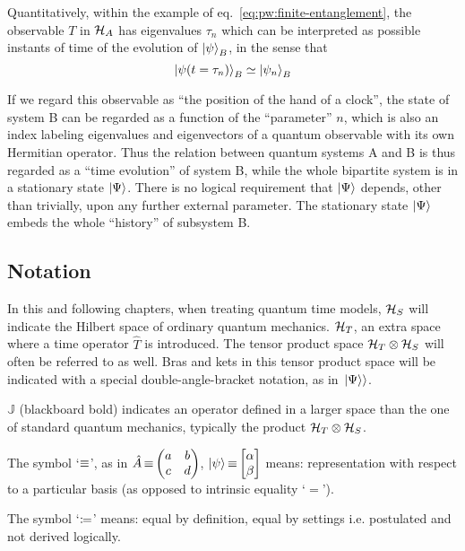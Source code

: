 Quantitatively, within the example of eq.~\eqref{eq:pw:finite-entanglement},
the observable $T$ in $\mathcal{H}_A$
has eigenvalues $\tau_n$ which can be interpreted as possible
instants of time of the evolution of $\ket{\psi}_B$, in the sense that
\begin{equation*}
  \ket{\psi(t=\tau_n)}_B \simeq \ket{\psi_n}_B
\end{equation*} 

If we regard this observable as ``the position of the hand of a clock'',
the state of system B can be regarded as a function of the ``parameter'' $n$,
which is also an index labeling
eigenvalues and eigenvectors of a quantum observable
with its own Hermitian operator.
Thus the relation between quantum systems A and B is thus regarded as
a ``time evolution'' of system B,
while the whole bipartite system
is in a stationary state
$\ket{\Psi}$.
There is no logical requirement that $\ket{\Psi}$
depends, other than trivially,
upon any further external parameter.
The stationary state $\ket{\Psi}$ embeds the whole ``history''
of subsystem B.

\subsection*{Notation}

In this and following chapters, when treating quantum time models,
$\mathcal{H}_S$ will indicate the Hilbert space of ordinary quantum mechanics.
$\mathcal{H}_T$, an extra space where a time operator $\hat{T}$ is introduced. The tensor
product space $\mathcal{H}_T \otimes \mathcal{H}_S$
will often be referred to as well.
Bras and kets in this tensor product space will be indicated with a special double-angle-bracket
notation, as in $\left.\left| \Psi \right\rangle\right\rangle$.

${\mathbb{J}}$ (blackboard bold) indicates an  operator defined in
a larger space than the one of standard quantum mechanics,
typically the product $\mathcal{H}_T \otimes \mathcal{H}_S$.

The symbol `$\operatorname*{\equiv}$', as in $\hat{A} \repr \mqty(a&b\\c&d)$, $\ket{\psi} \repr \mqty[\alpha \\ \beta]$
means: representation with respect to a particular basis (as opposed to intrinsic equality `$=$').

The symbol `$\coloneqq$'
means: equal by definition, equal by settings i.e. postulated and not derived logically.
